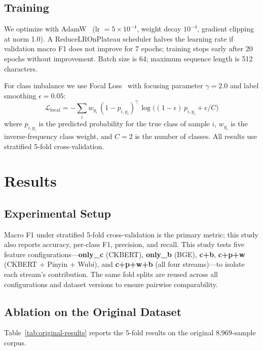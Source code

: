 ﻿\documentclass[12pt]{article}
\begin{document}
\subsection{Training}
We optimize with AdamW~\cite{loshchilov2019adamw} (lr $= 5 \times 10^{-4}$, weight decay $10^{-4}$, gradient clipping at norm 1.0). A ReduceLROnPlateau scheduler halves the learning rate if validation macro F1 does not improve for 7 epochs; training stops early after 20 epochs without improvement. Batch size is 64; maximum sequence length is 512 characters.

For class imbalance we use Focal Loss~\cite{lin2017focal} with focusing parameter $\gamma = 2.0$ and label smoothing $\epsilon = 0.05$:
\[
\mathcal{L}_{\mathrm{focal}} = -\sum_{i} w_{y_i}\,(1 - p_{i,y_i})^{\gamma} \, \log\bigl((1-\epsilon)\,p_{i,y_i} + \epsilon/C\bigr)
\]
where $p_{i,y_i}$ is the predicted probability for the true class of sample $i$, $w_{y_i}$ is the inverse-frequency class weight, and $C=2$ is the number of classes. All results use stratified 5-fold cross-validation.

\section{Results}

\subsection{Experimental Setup}
Macro F1 under stratified 5-fold cross-validation is the primary metric; this study also reports accuracy, per-class F1, precision, and recall. This study tests five feature configurations---\textbf{only\_c} (CKBERT), \textbf{only\_b} (BGE), \textbf{c+b}, \textbf{c+p+w} (CKBERT + Pinyin + Wubi), and \textbf{c+p+w+b} (all four streams)---to isolate each stream's contribution. The same fold splits are reused across all configurations and dataset versions to ensure pairwise comparability.

\subsection{Ablation on the Original Dataset}

Table~\ref{tab:original-results} reports the 5-fold results on the original 8{,}969-sample corpus.
\end{document}
